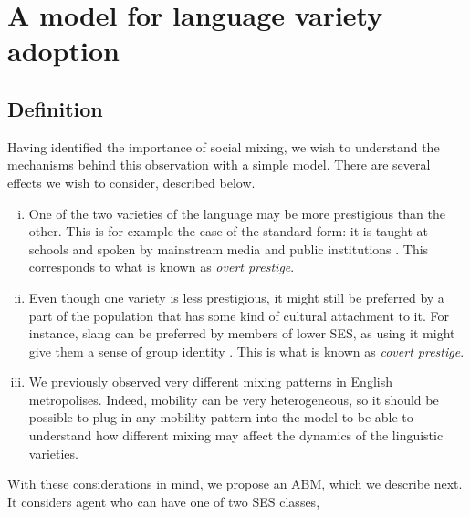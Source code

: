\documentclass[../thesis.tex]{subfiles}
\begin{document}
\section{A model for language variety adoption}

\subsection{Definition}
Having identified the importance of social mixing, we wish to understand the mechanisms
behind this observation with a simple model.
There are several effects we wish to
consider, described below.
\begin{enumerate}[(i)]
  \item One of the two varieties of the language may be more prestigious than the other.
  This is for example the case of the standard form: it is taught at schools and spoken
  by mainstream media and public institutions \cite{DavilaInevitabilityStandard2016}.
  This corresponds to what is known as \emph{overt prestige}.
  \item Even though one variety is less prestigious, it might still be preferred by a
  part of the population that has some kind of cultural attachment to it. For instance,
  slang can be preferred by members of lower \ac{SES}, as using it might give them a
  sense of group identity
  \cite{LabovSocialStratification1966,TrudgillSocialDifferentiation1974}. This
  is what is known as \emph{covert prestige}.
  \item We previously observed very different mixing patterns in English metropolises.
  Indeed, mobility can be very heterogeneous, so it should be possible to plug in any
  mobility pattern into the model to be able to understand how different mixing may
  affect the dynamics of the linguistic varieties.
\end{enumerate}
With these considerations in mind, we propose an \ac{ABM}, which we describe next. It
considers agent who can have one of two \ac{SES} classes,
\end{document}
